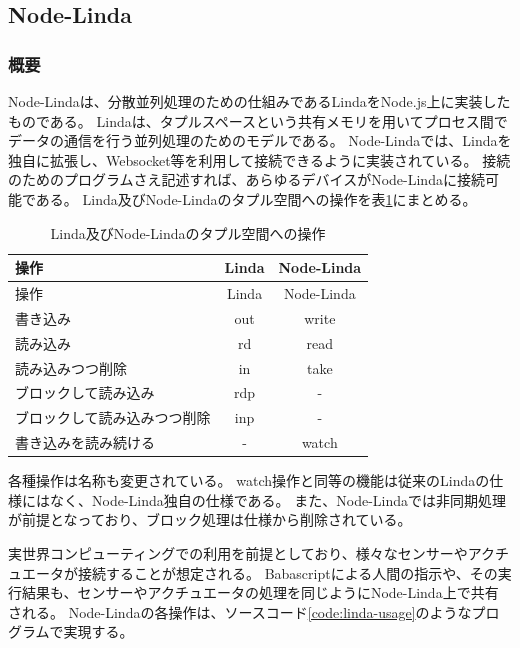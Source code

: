 \subsection{Node-Linda}\label{node-linda}

\subsubsection{概要}\label{ux6982ux8981}

Node-Linda\cite{node-linda}は、分散並列処理のための仕組みであるLinda\cite{linda}をNode.js上に実装したものである。
Lindaは、タプルスペースという共有メモリを用いてプロセス間でデータの通信を行う並列処理のためのモデルである。
Node-Lindaでは、Lindaを独自に拡張し、Websocket等を利用して接続できるように実装されている。
接続のためのプログラムさえ記述すれば、あらゆるデバイスがNode-Lindaに接続可能である。
Linda及びNode-Lindaのタプル空間への操作を表\ref{table:tuple-management}にまとめる。

\begin{longtable}[c]{@{}lcc@{}}
\caption{Linda及びNode-Lindaのタプル空間への操作
\label{table:tuple-management}}\tabularnewline
\toprule
操作 & Linda & Node-Linda\tabularnewline
\midrule
\endfirsthead
\toprule
操作 & Linda & Node-Linda\tabularnewline
\midrule
\endhead
書き込み & out & write\tabularnewline
読み込み & rd & read\tabularnewline
読み込みつつ削除 & in & take\tabularnewline
ブロックして読み込み & rdp & -\tabularnewline
ブロックして読み込みつつ削除 & inp & -\tabularnewline
書き込みを読み続ける & - & watch\tabularnewline
\bottomrule
\end{longtable}

各種操作は名称も変更されている。
watch操作と同等の機能は従来のLindaの仕様にはなく、Node-Linda独自の仕様である。
また、Node-Lindaでは非同期処理が前提となっており、ブロック処理は仕様から削除されている。

実世界コンピューティングでの利用を前提としており、様々なセンサーやアクチュエータが接続することが想定される。
Babascriptによる人間の指示や、その実行結果も、センサーやアクチュエータの処理を同じようにNode-Linda上で共有される。
Node-Lindaの各操作は、ソースコード\ref{code:linda-usage}のようなプログラムで実現する。

